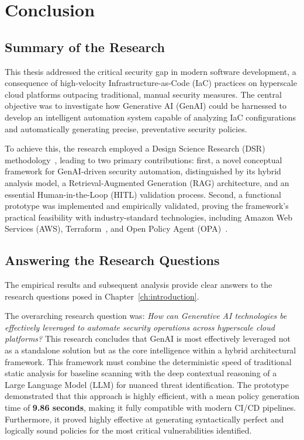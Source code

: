 
\chapter{Conclusion} %
\label{chap:conclusion} %

\section{Summary of the Research}

This thesis addressed the critical security gap in modern software development, a consequence of high-velocity Infrastructure-as-Code (IaC) practices on hyperscale cloud platforms outpacing traditional, manual security measures. The central objective was to investigate how Generative AI (GenAI) could be harnessed to develop an intelligent automation system capable of analyzing IaC configurations and automatically generating precise, preventative security policies.

To achieve this, the research employed a Design Science Research (DSR) methodology~\cite{Hevner2004}, leading to two primary contributions: first, a novel conceptual framework for GenAI-driven security automation, distinguished by its hybrid analysis model, a Retrieval-Augmented Generation (RAG) architecture, and an essential Human-in-the-Loop (HITL) validation process. Second, a functional prototype was implemented and empirically validated, proving the framework's practical feasibility with industry-standard technologies, including Amazon Web Services (AWS), Terraform~\cite{Howard2022_Terraform}, and Open Policy Agent (OPA)~\cite{openpolicyagent}.

\section{Answering the Research Questions}

The empirical results and subsequent analysis provide clear answers to the research questions posed in Chapter~\ref{ch:introduction}.

The overarching research question was: \textit{How can Generative AI technologies be effectively leveraged to automate security operations across hyperscale cloud platforms?}
This research concludes that GenAI is most effectively leveraged not as a standalone solution but as the core intelligence within a hybrid architectural framework. This framework must combine the deterministic speed of traditional static analysis for baseline scanning with the deep contextual reasoning of a Large Language Model (LLM) for nuanced threat identification. The prototype demonstrated that this approach is highly efficient, with a mean policy generation time of \textbf{9.86 seconds}, making it fully compatible with modern CI/CD pipelines. Furthermore, it proved highly effective at generating syntactically perfect and logically sound policies for the most critical vulnerabilities identified.

